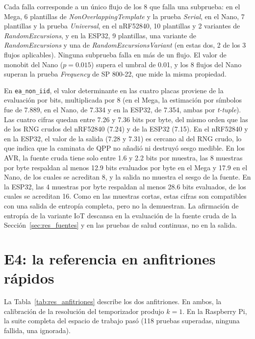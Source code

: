 Cada falla corresponde a un único flujo de los 8 que falla una subprueba: en el Mega, 6 plantillas de \textit{NonOverlappingTemplate} y la prueba \textit{Serial}, en el Nano, 7 plantillas y la prueba \textit{Universal}, en el nRF52840, 10 plantillas y 2 variantes de \textit{RandomExcursions}, y en la ESP32, 9 plantillas, una variante de \textit{RandomExcursions} y una de \textit{RandomExcursionsVariant} (en estas dos, 2 de los 3 flujos aplicables). Ninguna subprueba falla en más de un flujo. El valor de monobit del Nano ($p = 0.015$) supera el umbral de 0.01, y los 8 flujos del Nano superan la prueba \textit{Frequency} de SP 800-22, que mide la misma propiedad.

En \texttt{ea\_non\_iid}, el valor determinante en las cuatro placas proviene de la evaluación por bits, multiplicada por 8 (en el Mega, la estimación por símbolos fue de 7.889, en el Nano, de 7.334 y en la ESP32, de 7.354, ambas por \textit{t-tuple}). Las cuatro cifras quedan entre 7.26 y 7.36 bits por byte, del mismo orden que las de los RNG crudos del nRF52840 (7.24) y de la ESP32 (7.15). En el nRF52840 y en la ESP32, el valor de la salida (7.28 y 7.31) es cercano al del RNG crudo, lo que indica que la caminata de QPP no añadió ni destruyó sesgo medible. En los AVR, la fuente cruda tiene solo entre 1.6 y 2.2 bits por muestra, las 8 muestras por byte respaldan al menos 12.9 bits evaluados por byte en el Mega y 17.9 en el Nano, de los cuales se acreditan 8, y la salida no muestra el sesgo de la fuente. En la ESP32, las 4 muestras por byte respaldan al menos 28.6 bits evaluados, de los cuales se acreditan 16. Como en las muestras cortas, estas cifras son compatibles con una salida de entropía completa, pero no la demuestran. La afirmación de entropía de la variante IoT descansa en la evaluación de la fuente cruda de la Sección~\ref{sec:res_fuentes} y en las pruebas de salud continuas, no en la salida.

\section{E4: la referencia en anfitriones rápidos}
\label{sec:res_anfitriones}

La Tabla~\ref{tab:res_anfitriones} describe los dos anfitriones. En ambos, la calibración de la resolución del temporizador produjo $k = 1$. En la Raspberry Pi, la suite completa del espacio de trabajo pasó (118 pruebas superadas, ninguna fallida, una ignorada).

